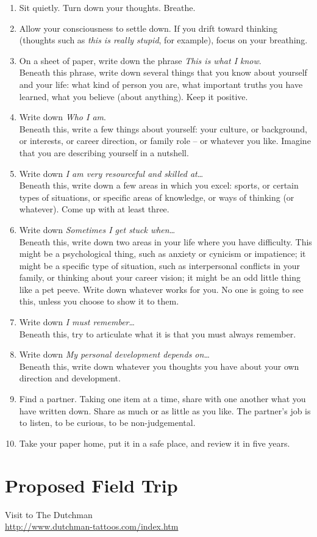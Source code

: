\documentclass[12pt,DIV9,oneside,headsepline,footsepline]{scrreprt}
\begin{document}
\begin{enumerate}
\item Sit quietly. Turn down your thoughts. Breathe.
\item Allow your consciousness to settle down. If you drift toward
thinking (thoughts such as \textit{this is really stupid}, for
example), focus on your breathing.
\item On a sheet of paper, write down the phrase \textit{This is what
I know}. \\
Beneath this phrase, write down several things that you know about
yourself and your life: what kind of person you are, what important
truths you have learned, what you believe (about anything). Keep it
positive.
\item Write down \textit{Who I am}. \\
Beneath this, write a few things about yourself: your culture, or
background, or interests, or career direction, or family role -- or
whatever you like. Imagine that you are describing yourself in a
nutshell.
\item Write down \textit{I am very resourceful and skilled at}\ldots
\\
Beneath this, write down a few areas in which you excel: sports, or
certain types of situations, or specific areas of knowledge, or ways
of thinking (or whatever). Come up with at least three.
\item Write down \textit{Sometimes I get stuck when}\ldots \\
Beneath this, write down two areas in your life where you have
difficulty. This might be a psychological thing, such as anxiety or
cynicism or impatience; it might be a specific type of situation, such
as interpersonal conflicts in your family, or thinking about your
career vision; it might be an odd little thing like a pet peeve. Write
down whatever works for you. No one is going to see this, unless you
choose to show it to them.
\item Write down \textit{I must remember}\ldots \\
Beneath this, try to articulate what it is that you must always
remember.
\item Write down \textit{My personal development depends on}\ldots \\
Beneath this, write down whatever you thoughts you have about your own
direction and development.
\item Find a partner. Taking one item at a time, share with one
another what you have written down. Share as much or as little as you
like. The partner's job is to listen, to be curious, to be
non-judgemental.
\item Take your paper home, put it in a safe place, and review it in
five years.
\end{enumerate}

\newpage
\section{Proposed Field Trip}

Visit to The Dutchman \\
\url{http://www.dutchman-tattoos.com/index.htm}
\end{document}
